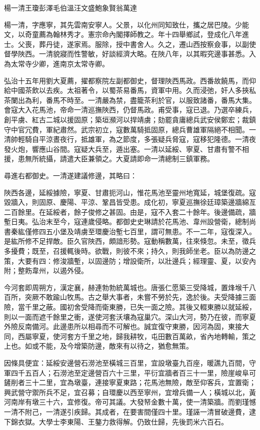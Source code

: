 
\begin{pinyinscope}
楊一清王瓊彭澤毛伯溫汪文盛鮑象賢翁萬達

楊一清，字應寧，其先雲南安寧人。父景，以化州同知致仕，攜之居巴陵。少能文，以奇童薦為翰林秀才。憲宗命內閣擇師教之。年十四舉鄉試，登成化八年進士。父喪，葬丹徒，遂家焉。服除，授中書舍人。久之，遷山西按察僉事，以副使督學陜西。一清貌寢而性警敏，好談經濟大略。在陜八年，以其暇究邊事甚悉。入為太常寺少卿，進南京太常寺卿。

弘治十五年用劉大夏薦，擢都察院左副都御史，督理陜西馬政。西番故饒馬，而仰給中國茶飲以去疾。太祖著令，以蜀茶易番馬，資軍中用。久而浸弛，奸人多挾私茶闌出為利，番馬不時至。一清嚴為禁，盡籠茶利於官，以服致諸番，番馬大集。會寇大入花馬池，帝命一清巡撫陜西，仍督馬政。甫受事，寇已退。乃選卒練兵，創平虜、紅古二城以援固原；築垣瀕河以捍靖虜；劾罷貪庸總兵武安侯鄭宏；裁鎮守中官冗費，軍紀肅然。武宗初立，寇數萬騎抵固原，總兵曹雄軍隔絕不相聞。一清帥輕騎自平涼晝夜行，抵雄軍，為之節度，多張疑兵脅寇，寇移犯隆德。一清夜發火炮，響應山谷間。寇疑大兵至，遁出塞。一清以延綏、寧夏、甘肅有警不相援，患無所統攝，請遣大臣兼領之。大夏請即命一清總制三鎮軍務。

尋進右都御史。一清遂建議修邊，其略曰：

陜西各邊，延綏據險，寧夏、甘肅扼河山，惟花馬池至靈州地寬延，城堡復疏。寇毀牆入，則固原、慶陽、平涼、鞏昌皆受患。成化初，寧夏巡撫徐廷璋築邊牆綿亙二百餘里。在延綏者，餘子俊修之甚固。由是，寇不入套二十餘年。後邊備疏，牆塹日夷。弘治末至今，寇連歲侵略。都御史史琳請於花馬池、韋州設營衛，總制尚書秦紘僅修四五小堡及靖虜至環慶治塹七百里，謂可無患。不一二年，寇復深入。是紘所修不足捍敵。臣久官陜西，頗諳形勢。寇動稱數萬，往來倏忽。未至，徵兵多擾費；既至，召援輒後時。欲戰，則彼不來；持久，則我師坐老。臣以為防邊之策，大要有四：修浚牆塹，以固邊防；增設衛所，以壯邊兵；經理靈、夏，以安內附；整飭韋州，以遏外侵。

今河套即周朔方，漢定襄，赫連勃勃統萬城也。唐張仁愿築三受降城，置烽堠千八百所，突厥不敢踰山牧馬。古之舉大事者，未嘗不勞於先，逸於後。夫受降據三面險，當千里之蔽。國初舍受降而衛東勝，已失一面之險。其後又輟東勝以就延綏，則以一面而遮千餘里之衝，遂使河套沃壤為寇巢穴。深山大河，勢乃在彼，而寧夏外險反南備河。此邊患所以相尋而不可解也。誠宜復守東勝，因河為固，東接大同，西屬寧夏，使河套方千里之地，歸我耕牧，屯田數百萬畝，省內地轉輸，策之上也。如或不能，及今增築防邊，敵來有以待之，猶愈無策。

因條具便宜：延綏安邊營石澇池至橫城三百里，宜設墩臺九百座，暖譙九百間，守軍四千五百人；石澇池至定邊營百六十三里，平衍宜牆者百三十一里，險崖峻阜可鏟削者三十二里，宜為墩臺，連接寧夏東路；花馬池無險，敵至仰客兵，宜置衛；興武營守禦所兵不足，宜召募；自環慶以西至寧州，宜增兵備一人；橫城以北，黃河南岸有墩三十六，宜修復。帝可其議。大發帑金數十萬，使一清築牆。而劉瑾憾一清不附己，一清遂引疾歸。其成者，在要害間僅四十里。瑾誣一清冒破邊費，逮下錦衣獄。大學士李東陽、王鏊力救得解。仍致仕歸，先後罰米六百石。


\end{pinyinscope}

